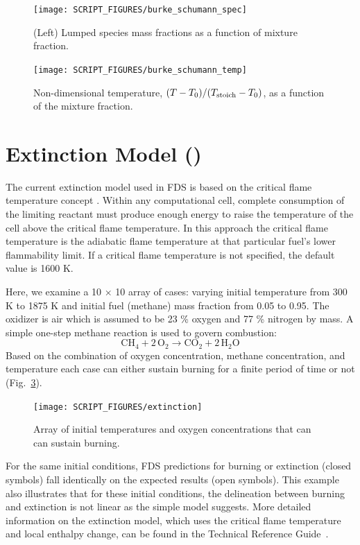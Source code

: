 \documentclass[11pt]{book}
\begin{document}
\begin{figure}[!ht]
\centering
\texttt{[image: SCRIPT\_FIGURES/burke\_schumann\_spec]}
\caption[Mixture fraction state relations for species ()]{(Left) Lumped species mass fractions as a function of mixture fraction.}
\label{fig:burke_schumann_spec}
\end{figure}

\begin{figure}[!ht]
\centering
\texttt{[image: SCRIPT\_FIGURES/burke\_schumann\_temp]}
\caption[Mixture fraction state relations for temperature ()]{Non-dimensional temperature, $(T-T_0)/(T_{\rm stoich} - T_0)$, as a function of the mixture fraction.}
\label{fig:burke_schumann_temp}
\end{figure}



\clearpage

\section{Extinction Model ()}
\label{Extinct}

The current extinction model used in FDS is based on the critical flame temperature concept \cite{SFPE:Beyler}. Within any computational cell, complete consumption of the limiting reactant must produce enough energy to raise the temperature of the cell above the critical flame temperature. In this approach the critical flame temperature is the adiabatic flame temperature at that particular fuel's lower flammability limit. If a critical flame temperature is not specified, the default value is 1600 K.

Here, we examine a 10 $\times$ 10 array of cases: varying initial temperature from 300 K to 1875 K and initial fuel (methane) mass fraction from 0.05 to 0.95. The oxidizer is air which is assumed to be 23 \% oxygen  and 77 \% nitrogen by mass. A simple one-step methane reaction is used to govern combustion:
\begin{equation}\label{eq:methane_ex}
\mathrm{CH_4 + 2\, O_2 \rightarrow  CO_2 + 2\, H_2O}
\end{equation}
Based on the combination of oxygen concentration, methane concentration, and temperature each case can either sustain burning for a finite period of time or not (Fig.~\ref{fig:extinct}).
\begin{figure}[h!]
\centering
\texttt{[image: SCRIPT\_FIGURES/extinction]}
\caption[ model test cases]{Array of initial temperatures and oxygen concentrations that can can sustain burning.}
\label{fig:extinct}
\end{figure}
For the same initial conditions, FDS predictions for burning or extinction (closed symbols) fall identically on the expected results (open symbols). This example also illustrates that for these initial conditions, the delineation between burning and extinction is not linear as the simple model suggests. More detailed information on the extinction model, which uses the critical flame temperature and local enthalpy change, can be found in the Technical Reference Guide~\cite{FDS_Tech_Guide}.
\end{document}
